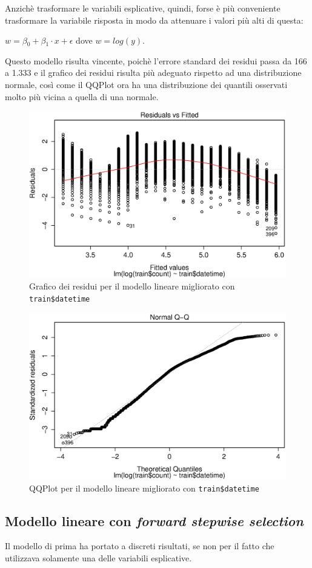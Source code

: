 Anzichè trasformare le variabili esplicative, quindi, forse è più conveniente
trasformare la variabile risposta in modo da attenuare i valori più alti di
questa:

\centering $ w = \beta{}_0 + \beta{}_1 \cdot{} x + \epsilon{} $
\flushleft dove $ w = log(y) $.

Questo modello risulta vincente, poichè l'errore standard dei residui passa da
166 a 1.333 e il grafico dei residui risulta più adeguato rispetto ad una
distribuzione normale, così come il QQPlot ora ha una distribuzione dei
quantili osservati molto più vicina a quella di una normale.

\begin{figure}[H]
  \centering
  \includegraphics[width=.7\columnwidth]{images/simple-lm-log-residuals.eps}
  \caption{Grafico dei residui per il modello lineare migliorato con
  \texttt{train\$datetime}}\label{fig:simpl-lm-log-residuals}
\end{figure}

\begin{figure}[H]
  \centering
  \includegraphics[width=.7\columnwidth]{images/simple-lm-log-qqplot.eps}
  \caption{QQPlot per il modello lineare migliorato con
  \texttt{train\$datetime}}\label{fig:simpl-lm-log-qqplot}
\end{figure}

\subsection{Modello lineare con \emph{forward stepwise selection}}\label{sec:mod-lin-fwd-sw}
Il modello di prima ha portato a discreti risultati, se non per il fatto che
utilizzava solamente una delle variabili esplicative.

